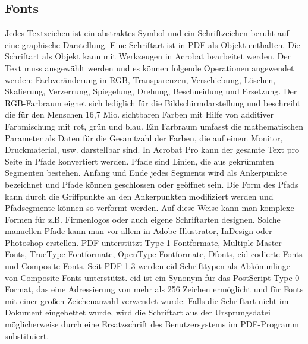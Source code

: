 \subsection{Fonts}
Jedes Textzeichen ist ein abstraktes Symbol und ein Schriftzeichen beruht auf eine graphische Darstellung. Eine Schriftart ist in PDF als Objekt enthalten. Die Schriftart als Objekt kann mit Werkzeugen in Acrobat bearbeitet werden. Der Text muss ausgewählt werden und es können folgende Operationen angewendet werden: Farbveränderung in RGB, Transparenzen, Verschiebung, Löschen, Skalierung, Verzerrung, Spiegelung, Drehung, Beschneidung und Ersetzung. Der RGB-Farbraum eignet sich lediglich für die Bildschirmdarstellung und beschreibt die für den Menschen 16,7 Mio. sichtbaren Farben mit Hilfe von additiver Farbmischung mit rot, grün und blau. Ein Farbraum umfasst die mathematischen Parameter als Daten für die Gesamtzahl der Farben, die auf einem Monitor, Druckmaterial, usw. darstellbar sind. 
\cite{farbraum}
In Acrobat Pro kann der gesamte Text pro Seite in Pfade konvertiert werden. Pfade sind Linien, die aus gekrümmten Segmenten bestehen. Anfang und Ende jedes Segments wird als Ankerpunkte bezeichnet und Pfade können geschlossen oder geöffnet sein. Die Form des Pfads kann durch die Griffpunkte an den Ankerpunkten modifiziert werden und Pfadsegmente können so verformt werden. \cite{adobe-pfade} Auf diese Weise kann man komplexe Formen für z.B. Firmenlogos oder auch eigene Schriftarten designen. Solche manuellen Pfade kann man vor allem in Adobe Illustrator, InDesign oder Photoshop erstellen. PDF unterstützt Type-1 Fontformate, Multiple-Master-Fonts, TrueType-Fontformate, OpenType-Fontformate, Dfonts, \gls{cid} codierte Fonts und Composite-Fonts. Seit PDF 1.3 werden \gls{cid} Schrifttypen als Abkömmlinge von Composite-Fonts unterstützt. \gls{cid} ist ein Synonym für das PostScript Type-0 Format, das eine Adressierung von mehr als 256 Zeichen ermöglicht und für Fonts mit einer großen Zeichenanzahl verwendet wurde. \cite{typoinfo} Falls die Schriftart nicht im Dokument eingebettet wurde, wird die Schriftart aus der Ursprungsdatei möglicherweise durch eine Ersatzschrift des Benutzersystems im PDF-Programm substituiert. \cite{schneeberger}

